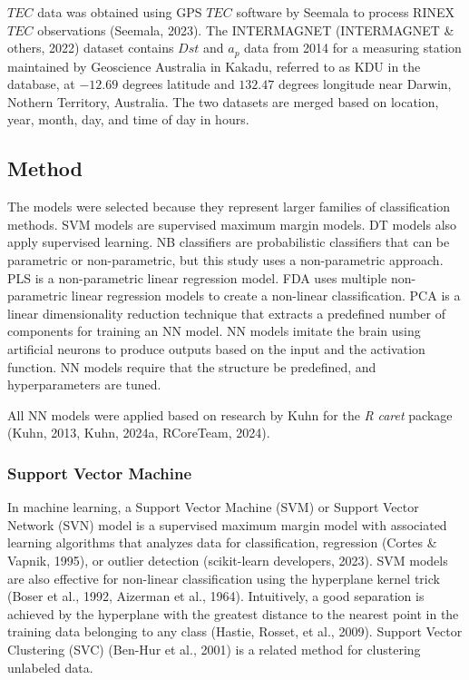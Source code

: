 \documentclass[sn-mathphys-num]{sn-jnl}%
\begin{document}
$TEC$ data was obtained using GPS $TEC$ software by Seemala to process RINEX $TEC$ observations (Seemala, 2023). The INTERMAGNET (INTERMAGNET & others, 2022) dataset contains $Dst$ and $a_{p}$ data from 2014 for a measuring station maintained by Geoscience Australia in Kakadu, referred to as KDU in the database, at $-12.69$ degrees latitude and $132.47$ degrees longitude near Darwin, Nothern Territory, Australia. The two datasets are merged based on location, year, month, day, and time of day in hours.

\subsection{Method}

The models were selected because they represent larger families of classification methods. SVM models are supervised maximum margin models. DT models also apply supervised learning. NB classifiers are probabilistic classifiers that can be parametric or non-parametric, but this study uses a non-parametric approach. PLS is a non-parametric linear regression model. FDA uses multiple non-parametric linear regression models to create a non-linear classification. PCA is a linear dimensionality reduction technique that extracts a predefined number of components for training an NN model. NN models imitate the brain using artificial neurons to produce outputs based on the input and the activation function. NN models require that the structure be predefined, and hyperparameters are tuned.

All NN models were applied based on research by Kuhn for the \textit{R} \textit{caret} package (Kuhn, 2013, Kuhn, 2024a, RCoreTeam, 2024).

\subsubsection{Support Vector Machine}

In machine learning, a Support Vector Machine (SVM) or Support Vector Network (SVN) model is a supervised maximum margin model with associated learning algorithms that analyzes data for classification, regression (Cortes & Vapnik, 1995), or outlier detection (scikit-learn developers, 2023). SVM models are also effective for non-linear classification using the hyperplane kernel trick (Boser et al., 1992, Aizerman et al., 1964). Intuitively, a good separation is achieved by the hyperplane with the greatest distance to the nearest point in the training data belonging to any class (Hastie, Rosset, et al., 2009). Support Vector Clustering (SVC) (Ben-Hur et al., 2001) is a related method for clustering unlabeled data.
\end{document}
